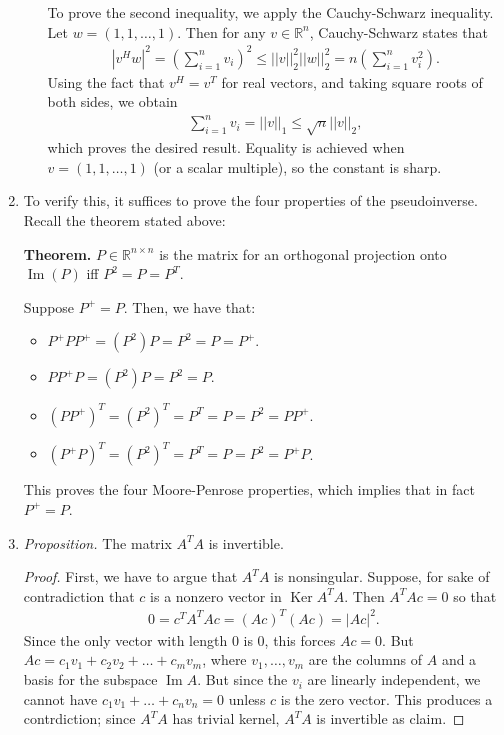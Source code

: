 \documentclass{article}
\newcommand{\RR}{\mathbb{R}}
\DeclareMathOperator{\Ker}{Ker}
\DeclareMathOperator{\Ima}{Im}
\begin{document}
\begin{enumerate}
\begin{enumerate}
        To prove the second inequality, we apply the Cauchy-Schwarz inequality.  Let $w = (1, 1, \dots, 1)$.  Then for any $v \in \RR^n$, Cauchy-Schwarz states that
        \begin{align*}
          |v^H w |^2 =  \left ( \sum_{i=1}^{n} v_i \right )^2 \leq ||v||_2^2 ||w||_2^2 =  n \left ( \sum_{i=1}^{n} v_i^2 \right ).
        \end{align*}
        Using the fact that $v^H = v^T$ for real vectors, and taking square roots of both sides, we obtain
        \begin{align*}
          \sum_{i=1}^{n} v_i = ||v||_1 \leq \sqrt{n} ||v||_2,
        \end{align*}
        which proves the desired result.  Equality is achieved when $v = (1, 1, \dots, 1)$ (or a scalar multiple), so the constant is sharp.
    \end{enumerate}

  \item To verify this, it suffices to prove the four properties of the pseudoinverse.  Recall the theorem stated above:

{\bf Theorem.} $P \in \RR^{n \times n}$ is the matrix for an orthogonal projection onto $\Ima (P)$ iff $P^2 = P = P^T$.

Suppose $P^{+} = P$.  Then, we have that:
\begin{itemize}
  \item $P^{+} P P^{+} = (P^2) P = P^2 = P = P^{+}$.
  \item $P P^{+} P = (P^2) P = P^2 = P$.
  \item $(P P^{+})^T = (P^2)^T = P^T = P = P^2 = P P^{+}$.
  \item $(P^{+} P)^T = (P^2)^T = P^T = P = P^2 = P^{+} P$.
\end{itemize}

This proves the four Moore-Penrose properties, which implies that in fact $P^{+} = P$.

  \item 

    {\it Proposition.} The matrix $A^TA$ is invertible.

    \begin{proof}
    First, we have to argue that $A^T A$ is nonsingular.  Suppose, for sake of contradiction that $c$ is a nonzero vector in $\Ker A^T A$.  Then $A^T A c = 0$ so that
    \begin{align*}
      0 = c^T A^T A c = (A c)^T (Ac) = |Ac|^2.
    \end{align*}
    Since the only vector with length 0 is 0, this forces $Ac = 0$.  But $Ac = c_1 v_1 + c_2 v_2 + \dots + c_m v_m$, where $v_1, \dots, v_m$ are the columns of $A$ and a basis for the subspace $\Ima A$.  But since the $v_i$ are linearly independent, we cannot have $c_1 v_1 + \dots + c_n v_n = 0$ unless $c$ is the zero vector.  This produces a contrdiction; since $A^T A$ has trivial kernel, $A^T A$ is invertible as claim.
    \end{proof}


\end{enumerate}
\end{document}
